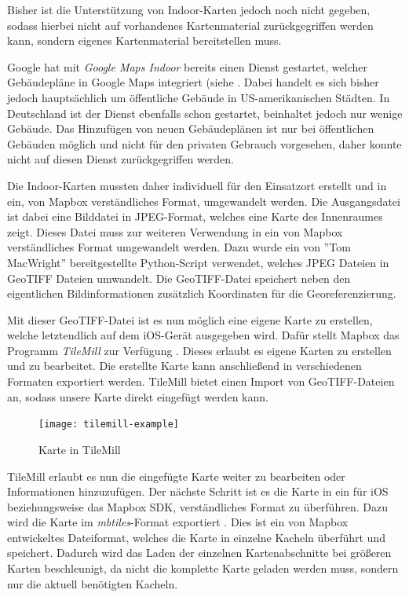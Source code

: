 Bisher ist die Unterstützung von Indoor-Karten jedoch noch nicht gegeben, sodass hierbei nicht auf vorhandenes Kartenmaterial zurückgegriffen werden kann, sondern eigenes Kartenmaterial bereitstellen muss.

Google hat mit \emph{Google Maps Indoor} bereits einen Dienst gestartet, welcher Gebäudepläne in Google Maps integriert (siehe \cite{googleindoormaps}. Dabei handelt es sich bisher jedoch hauptsächlich um öffentliche Gebäude in US-amerikanischen Städten. In Deutschland ist der Dienst ebenfalls schon gestartet, beinhaltet jedoch nur wenige Gebäude. Das Hinzufügen von neuen Gebäudeplänen ist nur bei öffentlichen Gebäuden möglich und nicht für den privaten Gebrauch vorgesehen, daher konnte nicht auf diesen Dienst zurückgegriffen werden.

Die Indoor-Karten mussten daher individuell für den Einsatzort erstellt und in ein, von Mapbox verständliches Format, umgewandelt werden.
Die Ausgangsdatei ist dabei eine Bilddatei in JPEG-Format, welches eine Karte des Innenraumes zeigt. Dieses Datei muss zur weiteren Verwendung in ein von Mapbox verständliches Format umgewandelt werden. 
Dazu wurde ein von ''Tom MacWright'' \cite{jpgtogeo} bereitgestellte Python-Script verwendet, welches JPEG Dateien in GeoTIFF Dateien umwandelt. Die GeoTIFF-Datei \cite{geotiff} speichert neben den eigentlichen Bildinformationen zusätzlich Koordinaten für die Georeferenzierung. 

Mit dieser GeoTIFF-Datei ist es nun möglich eine eigene Karte zu erstellen, welche letztendlich auf dem iOS-Gerät ausgegeben wird.
Dafür stellt Mapbox das Programm \emph{TileMill} zur Verfügung \cite{tilemill}. Dieses erlaubt es eigene Karten zu erstellen und zu bearbeitet. Die erstellte Karte kann anschließend in verschiedenen Formaten exportiert werden. 
TileMill bietet einen Import von GeoTIFF-Dateien an, sodass unsere Karte direkt eingefügt werden kann.

\begin{figure}[htb!]
	\centering
	\texttt{[image: tilemill-example]}
	\caption{Karte in TileMill}
	\label{tilemill-example}
\end{figure}

TileMill erlaubt es nun die eingefügte Karte weiter zu bearbeiten oder Informationen hinzuzufügen.
Der nächste Schritt ist es die Karte in ein für iOS beziehungsweise das Mapbox SDK, verständliches Format zu überführen.
Dazu wird die Karte im \emph{mbtiles}-Format exportiert \cite{mbtiles}. Dies ist ein von Mapbox entwickeltes Dateiformat, welches die Karte in einzelne Kacheln überführt und speichert. Dadurch wird das Laden der einzelnen Kartenabschnitte bei größeren Karten beschleunigt, da nicht die komplette Karte geladen werden muss, sondern nur die aktuell benötigten Kacheln.

